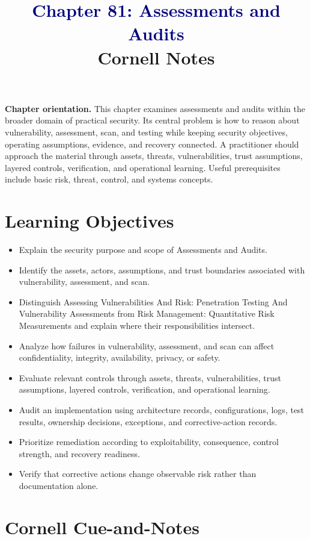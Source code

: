 \documentclass[11pt]{article}
\title{\textcolor{Navy}{Chapter 81: Assessments and Audits}\\[2mm]\large Cornell Notes}
\author{}
\date{}
\begin{document}
\maketitle
\thispagestyle{fancy}
\vspace{-1.5em}
\begin{orientationbox}
\textbf{Chapter orientation.} This chapter examines assessments and audits within the broader domain of practical security. Its central problem is how to reason about vulnerability, assessment, scan, and testing while keeping security objectives, operating assumptions, evidence, and recovery connected. A practitioner should approach the material through assets, threats, vulnerabilities, trust assumptions, layered controls, verification, and operational learning. Useful prerequisites include basic risk, threat, control, and systems concepts.
\end{orientationbox}
\section*{Learning Objectives}
\begin{itemize}
\item Explain the security purpose and scope of Assessments and Audits.
\item Identify the assets, actors, assumptions, and trust boundaries associated with vulnerability, assessment, and scan.
\item Distinguish Assessing Vulnerabilities And Risk: Penetration Testing And Vulnerability Assessments from Risk Management: Quantitative Risk Measurements and explain where their responsibilities intersect.
\item Analyze how failures in vulnerability, assessment, and scan can affect confidentiality, integrity, availability, privacy, or safety.
\item Evaluate relevant controls through assets, threats, vulnerabilities, trust assumptions, layered controls, verification, and operational learning.
\item Audit an implementation using architecture records, configurations, logs, test results, ownership decisions, exceptions, and corrective-action records.
\item Prioritize remediation according to exploitability, consequence, control strength, and recovery readiness.
\item Verify that corrective actions change observable risk rather than documentation alone.
\end{itemize}
\section*{Cornell Cue-and-Notes}
\end{document}
